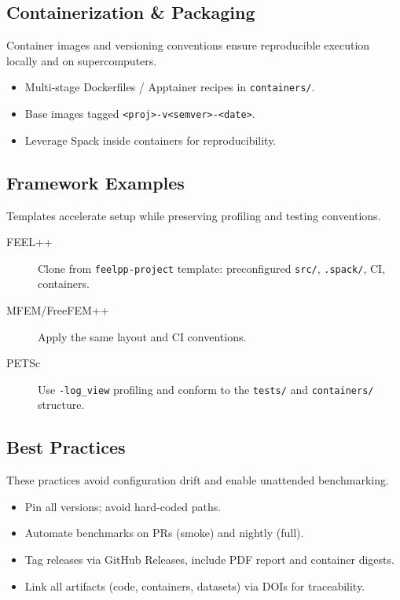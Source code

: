 \subsection{Containerization \& Packaging}
Container images and versioning conventions ensure reproducible execution locally and on supercomputers.
\begin{itemize}
  \item Multi-stage Dockerfiles / Apptainer recipes in \texttt{containers/}.
  \item Base images tagged \texttt{<proj>-v<semver>-<date>}.
  \item Leverage Spack inside containers for reproducibility.
\end{itemize}

\subsection{Framework Examples}
Templates accelerate setup while preserving profiling and testing conventions.
\begin{description}
  \item[FEEL++] Clone from \texttt{feelpp-project} template: preconfigured \texttt{src/}, \texttt{.spack/}, CI, containers.
  \item[MFEM/FreeFEM++] Apply the same layout and CI conventions.
  \item[PETSc] Use \texttt{-log\_view} profiling and conform to the \texttt{tests/} and \texttt{containers/} structure.
\end{description}

\subsection{Best Practices}
These practices avoid configuration drift and enable unattended benchmarking.
\begin{itemize}
  \item Pin all versions; avoid hard-coded paths.
  \item Automate benchmarks on PRs (smoke) and nightly (full).
  \item Tag releases via GitHub Releases, include PDF report and container digests.
  \item Link all artifacts (code, containers, datasets) via DOIs for traceability.
\end{itemize}
